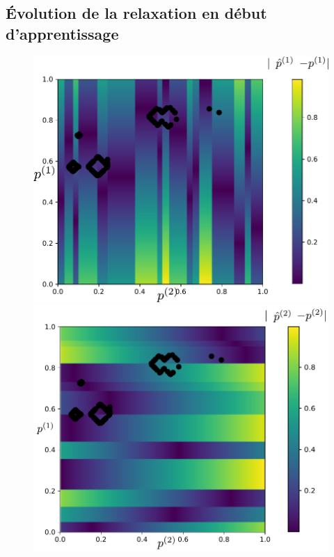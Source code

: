 \documentclass[../main]{subfiles}
\begin{document}
\subsection{\'Evolution de la relaxation en début d'apprentissage}

\begin{figure}
	\begin{minipage}{0.5\textwidth}
	\centering
	\includegraphics[width=\textwidth]{champ_X_006_t1_notraj.pdf}
	\end{minipage}
	\begin{minipage}{0.5\textwidth}
	\centering
	\includegraphics[width=\textwidth]{champ_Y_006_t1_notraj.pdf}

\end{minipage}
\end{figure}
\end{document}

